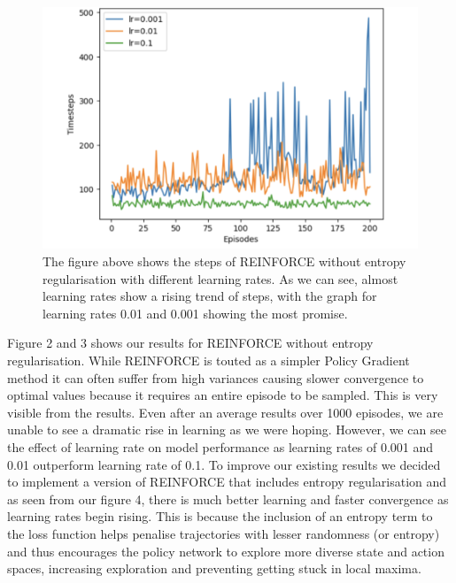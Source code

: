 \documentclass{article}
\begin{document}
\begin{figure}[htbp]
\centering
\includegraphics[width=0.9\linewidth]{Report/images/reinforce_basic_image2.png}
\caption{\label{fig:ReinforceEntropy_Rewards}The figure above shows the steps of REINFORCE without entropy regularisation with different learning rates. As we can see, almost learning rates show a rising trend of steps, with the graph for learning rates 0.01 and 0.001 showing the most promise. }
\end{figure}


Figure 2 and 3 shows our results for REINFORCE without entropy regularisation. While REINFORCE is touted as a simpler Policy Gradient method it can often suffer from high variances causing slower convergence to optimal values because it requires an entire episode to be sampled. This is very visible from the results. Even after an average results over 1000 episodes, we are unable to see a dramatic rise in learning as we were hoping. However, we can see the effect of learning rate on model performance as learning rates of 0.001 and 0.01 outperform learning rate of 0.1. To improve our existing results we decided to implement a version of REINFORCE that includes entropy regularisation and as seen from our figure 4, there is much better learning and faster convergence as learning rates begin rising. This is because the inclusion of an entropy term to the loss function helps penalise trajectories with lesser randomness (or entropy) and thus encourages the policy network to explore more diverse state and action spaces, increasing exploration and preventing getting stuck in local maxima. 
\end{document}
